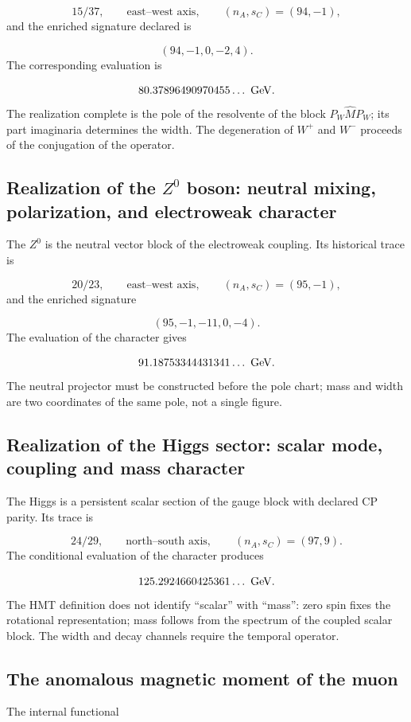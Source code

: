 \[
 15/37,\qquad \text{east--west axis},\qquad
 (n_A,s_C)=(94,-1),
\]
and the enriched signature declared is

\[
 (94,-1,0,-2,4).
\]
The corresponding evaluation is

\[
 80.37896490970455\ldots\ {\rm GeV}.
\]
The realization complete is the pole of the resolvente of the block \(P_W\widehat M P_W\); its part imaginaria determines the width. The degeneration of \(W^+\) and \(W^-\) proceeds of the conjugation of the operator.

\subsection{Realization of the \(Z^0\) boson: neutral mixing, polarization, and electroweak character}
The \(Z^0\) is the neutral vector block of the electroweak coupling. Its historical trace is

\[
 20/23,\qquad \text{east--west axis},\qquad
 (n_A,s_C)=(95,-1),
\]
and the enriched signature

\[
 (95,-1,-11,0,-4).
\]
The evaluation of the character gives

\[
 91.18753344431341\ldots\ {\rm GeV}.
\]
The neutral projector must be constructed before the pole chart; mass and width are two coordinates of the same pole, not a single figure.

\subsection{Realization of the Higgs sector: scalar mode, coupling and mass character}
The Higgs is a persistent scalar section of the gauge block with declared CP parity. Its trace is

\[
 24/29,\qquad \text{north--south axis},\qquad
 (n_A,s_C)=(97,9).
\]
The conditional evaluation of the character produces

\[
 125.2924660425361\ldots\ {\rm GeV}.
\]
The HMT definition does not identify “scalar” with “mass”: zero spin fixes the rotational representation; mass follows from the spectrum of the coupled scalar block. The width and decay channels require the temporal operator.

\subsection{The anomalous magnetic moment of the muon}
The internal functional


